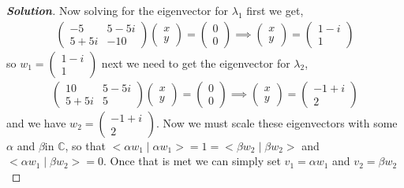 \documentclass[11pt]{article}
\newenvironment{solution}{\begin{proof}[\textbf{\textit{Solution}}] }{\end{proof}}
\newcommand{\cc}{\mathbb C}   %
\begin{document}
\begin{solution}
            Now solving for the eigenvector for $\lambda_1$ first we get,
            \begin{align*}
                \begin{pmatrix}
                    -5 & 5-5i \\
                    5+5i & -10
                \end{pmatrix} \begin{pmatrix}
                    x \\ y
                \end{pmatrix} = \begin{pmatrix} 0 \\ 0 \end{pmatrix} \implies \begin{pmatrix}
                    x \\ y
                \end{pmatrix} = \begin{pmatrix}
                    1 - i \\ 1
                \end{pmatrix}
            \end{align*}
            so $w_1 = \begin{pmatrix}
                1 - i \\ 1
            \end{pmatrix}$ next we need to get the eigenvector for $\lambda_2$,
            \begin{align*}
                \begin{pmatrix}
                    10 & 5-5i \\
                    5+5i & 5
                \end{pmatrix} \begin{pmatrix}
                    x \\ y
                \end{pmatrix} = \begin{pmatrix}
                    0 \\ 0
                \end{pmatrix} \implies \begin{pmatrix}
                    x \\ y
                \end{pmatrix} =\begin{pmatrix}
                    -1 + i \\ 2
                \end{pmatrix}
            \end{align*}
            and we have $w_2 = \begin{pmatrix}
                -1 + i \\ 2
            \end{pmatrix}$. Now we must scale these eigenvectors with some $\alpha$ and $\beta$in $\cc$, so that $<\alpha w_1 \mid \alpha w_1> = 1 = <\beta w_2 \mid \beta w_2>$ and $<\alpha w_1 \mid \beta w_2> = 0$. Once that is met we can simply set $v_1 = \alpha w_1$ and $v_2 = \beta w_2$


\end{solution}
\end{document}
